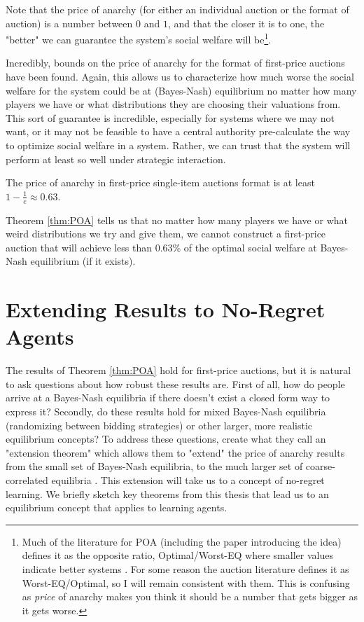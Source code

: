 \documentclass[12pt,twoside]{reedthesis}
\begin{document}
Note that the price of anarchy (for either an individual auction or the format of auction) is a number between $0$ and $1$, and that the closer it is to one, the "better" we can guarantee the system's social welfare will be\footnote{Much of the literature for POA (including the paper introducing the idea) defines it as the opposite ratio, Optimal/Worst-EQ where smaller values indicate better systems \citep{Koutsoupias1999}. For some reason the auction literature defines it as Worst-EQ/Optimal, so I will remain consistent with them. This is confusing as {\em price} of anarchy makes you think it should be a number that gets bigger as it gets worse.}.

Incredibly, bounds on the price of anarchy for the format of first-price auctions have been found. Again, this allows us to characterize how much worse the social welfare for the system could be at (Bayes-Nash) equilibrium no matter how many players we have or what distributions they are choosing their valuations from. This sort of guarantee is incredible, especially for systems where we may not want, or it may not be feasible to have a central authority pre-calculate the way to optimize social welfare in a system. Rather, we can trust that the system will perform at least so well under strategic interaction.

\begin{theorem}{\citep{Syrgkanis2013}}
	The price of anarchy in first-price single-item auctions format is at least $1-\frac{1}{e} \approx 0.63$.
	\label{thm:POA}	
\end{theorem}

Theorem \ref{thm:POA} tells us that no matter  how many players we have or what weird distributions we try and give them, we cannot construct a first-price auction that will achieve less than $0.63$\% of the optimal social welfare at Bayes-Nash equilibrium (if it exists). 
 
\section{Extending Results to No-Regret Agents}
The results of Theorem \ref{thm:POA} hold for first-price auctions, but it is natural to ask questions about how robust these results are. First of all, how do people arrive at a Bayes-Nash equilibria if there doesn't exist a closed form way to express it? Secondly, do these results hold for mixed Bayes-Nash equilibria (randomizing between bidding strategies) or other larger, more realistic equilibrium concepts? To address these questions, \cite{Roughgarden2017} create what they call an "extension theorem" which allows them to "extend" the price of anarchy results from the small set of Bayes-Nash equilibria, to the much larger set of coarse-correlated equilibria  \citep[p.~60]{Roughgarden2017}.  This extension will take us to a concept of no-regret learning. We briefly sketch key theorems from this thesis that lead us to an equilibrium concept that applies to learning agents.
\end{document}

